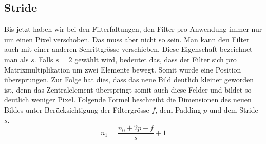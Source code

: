 \subsection{Stride}
Bis jetzt haben wir bei den Filterfaltungen, den Filter pro Anwendung immer nur
um einen Pixel verschoben. Das muss aber nicht so sein. Man kann den Filter
auch mit einer anderen Schrittgrösse verschieben. Diese Eigenschaft bezeichnet
man als  $s$. Falls $s = 2$ gewählt wird, bedeutet das, dass der
Filter sich pro Matrixmultiplikation um zwei Elemente bewegt. Somit wurde eine
Position übersprungen. Zur Folge hat dies, dass das neue Bild
deutlich kleiner geworden ist, denn das Zentralelement überspringt somit auch
diese Felder und bildet so deutlich weniger Pixel.
\para{}
Folgende Formel beschreibt die Dimensionen des neuen Bildes unter
Berücksichtigung der Filtergrösse $f$, dem Padding $p$ und dem Stride $s$.
\\
\begin{equation}
  n_1 = \frac{n_0 + 2p - f}{s} + 1
\end{equation}

\cite{deeplearning.ai:cnn}

